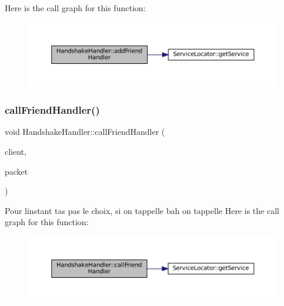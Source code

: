 Here is the call graph for this function\+:
\nopagebreak
\begin{figure}[H]
\begin{center}
\leavevmode
\includegraphics[width=350pt]{classHandshakeHandler_aa0ebcde41ffa598adaa99c6e55389344_cgraph}
\end{center}
\end{figure}
\mbox{\label{classHandshakeHandler_adeaf54ffd2fa8a3b6b9eb60a458b56e0}} 
\subsubsection{\texorpdfstring{call\+Friend\+Handler()}{callFriendHandler()}}
{\footnotesize\ttfamily void Handshake\+Handler\+::call\+Friend\+Handler (\begin{DoxyParamCaption}\item[{boost\+::shared\+\_\+ptr$<$ \mbox{\hyperlink{classClient}{Client}} $>$}]{client,  }\item[{std\+::unique\+\_\+ptr$<$ I\+Packet $>$ \&}]{packet }\end{DoxyParamCaption})\hspace{0.3cm}{\ttfamily [static]}}

Pour l\textquotesingle{}instant t\textquotesingle{}as pas le choix, si on t\textquotesingle{}appelle bah on t\textquotesingle{}appelle Here is the call graph for this function\+:
\nopagebreak
\begin{figure}[H]
\begin{center}
\leavevmode
\includegraphics[width=350pt]{classHandshakeHandler_adeaf54ffd2fa8a3b6b9eb60a458b56e0_cgraph}
\end{center}
\end{figure}
\mbox{\label{classHandshakeHandler_aef80330a36ad493211e1a4b2e321f3f1}} 
